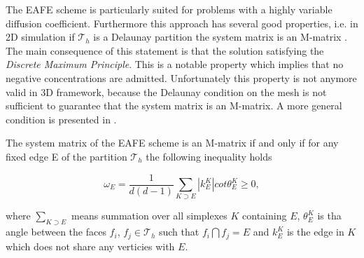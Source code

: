 %
%
%
%
%
%


The EAFE scheme is particularly suited for problems with a highly variable diffusion coefficient. Furthermore this approach has several good properties, i.e. in 2D simulation if $\mathcal{T}_h$ is a Delaunay partition the system matrix is an M-matrix \cite{BankMmatrixEAFE}. The main consequence of this statement is that the solution satisfying the \textit{Discrete Maximum Principle}. This is a notable property which implies that no negative concentrations are admitted. Unfortunately this property is not anymore valid in 3D framework, because the Delaunay condition on the mesh is not sufficient to guarantee that the system matrix is an M-matrix. A more general condition is presented in \cite{Zikatanov:EAFE1}.

\begin{Teorema}
The system matrix of the EAFE scheme is an M-matrix if and only if for any fixed edge E of the partition $\mathcal{T}_h$ the following inequality holds

\begin{equation}
\label{eq: mesh delaunay condition}
\omega_E = \dfrac{1}{d(d-1)} \sum_{K\supset E} |k_E^K|cot\theta_E^K \geq 0,
\end{equation}

where $\sum_{K \supset E}$ means summation over all simplexes $K$ containing $E$, $\theta_E^K$ is tha angle between the faces $f_i$, $f_j \in \mathcal{T}_h$ such that $f_i \bigcap f_j = E$  and $k_E^K$ is the edge in $K$ which does not share any verticies with $E$.
\end{Teorema}

